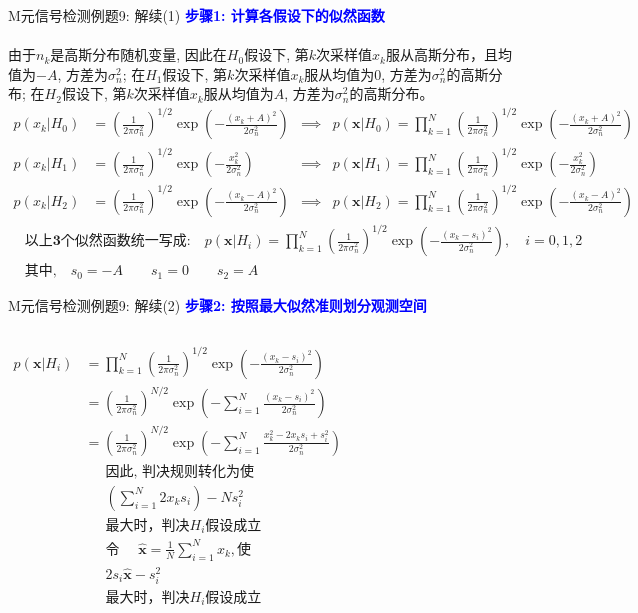 \begin{frame}[shrink]{M元信号检测例题9: 解续(1)}
\textbf{\textcolor{blue}{步骤1: 计算各假设下的似然函数}}\\
~\\
由于$n_k$是高斯分布随机变量, 因此在$H_0$假设下, 第$k$次采样值$x_k$服从高斯分布，且均值为$-A$, 方差为$\sigma_n^2$; 在$H_1$假设下, 第$k$次采样值$x_k$服从均值为0, 方差为$\sigma_n^2$的高斯分布; 在$H_2$假设下, 第$k$次采样值$x_k$服从均值为$A$, 方差为$\sigma_n^2$的高斯分布。
\scriptsize
\begin{align*}
p(x_k|H_0)&=\left(\frac{1}{2\pi\sigma_n^2}\right)^{1/2}\exp\left(-\frac{(x_k+A)^2}{2\sigma_n^2}\right)
&\implies& p(\bm{x}|H_0)=\prod_{k=1}^{N}\left(\frac{1}{2\pi\sigma_n^2}\right)^{1/2}\exp\left(-\frac{(x_k+A)^2}{2\sigma_n^2}\right)\\
p(x_k|H_1)&=\left(\frac{1}{2\pi\sigma_n^2}\right)^{1/2}\exp\left(-\frac{x_k^2}{2\sigma_n^2}\right)&\implies& p(\bm{x}|H_1)=\prod_{k=1}^{N}\left(\frac{1}{2\pi\sigma_n^2}\right)^{1/2}\exp\left(-\frac{x_k^2}{2\sigma_n^2}\right)\\
p(x_k|H_2)&=\left(\frac{1}{2\pi\sigma_n^2}\right)^{1/2}\exp\left(-\frac{(x_k-A)^2}{2\sigma_n^2}\right)&\implies& p(\bm{x}|H_2)=\prod_{k=1}^{N}\left(\frac{1}{2\pi\sigma_n^2}\right)^{1/2}\exp\left(-\frac{(x_k-A)^2}{2\sigma_n^2}\right)
\end{align*} 
\normalsize
\begin{align*}
&\textbf{以上3个似然函数统一写成:} \quad p(\bm{x}|H_i)=\prod_{k=1}^{N}\left(\frac{1}{2\pi\sigma_n^2}\right)^{1/2}\exp\left(-\frac{(x_k-s_i)^2}{2\sigma_n^2}\right),\quad i=0,1,2\\
&\text{其中,} \quad s_0=-A\qquad s_1=0\qquad s_2=A
\end{align*}
\end{frame}

\begin{frame}[shrink]{M元信号检测例题9: 解续(2)}
\textbf{\textcolor{blue}{步骤2: 按照最大似然准则划分观测空间}}
\begin{columns}[T]
\begin{align*}
p(\bm{x}|H_i)&=\prod_{k=1}^{N}\left(\frac{1}{2\pi\sigma_n^2}\right)^{1/2}\exp\left(-\frac{(x_k-s_i)^2}{2\sigma_n^2}\right)\\
&=\left(\frac{1}{2\pi\sigma_n^2}\right)^{N/2}\exp\left(-\sum_{i=1}^{N}\frac{(x_k-s_i)^2}{2\sigma_n^2}\right)\\
&=\left(\frac{1}{2\pi\sigma_n^2}\right)^{N/2}\exp\left(-\sum_{i=1}^{N}\frac{x_k^2-2x_ks_i+s_i^2}{2\sigma_n^2}\right)
\end{align*}
\begin{align*}
&\text{因此, 判决规则转化为使}\\
&\left(\sum_{i=1}^{N}2x_ks_i\right)-Ns_i^2\\
&\text{最大时，判决$H_i$假设成立}\\
&\text{令 }\quad \bm{\hat{x}}=\frac{1}{N}\sum_{i=1}^{N}x_k, \text{使}\\
&2s_i\bm{\hat{x}}-s_i^2\\
&\text{最大时，判决$H_i$假设成立}
\end{align*}
\end{columns}
\end{frame}

